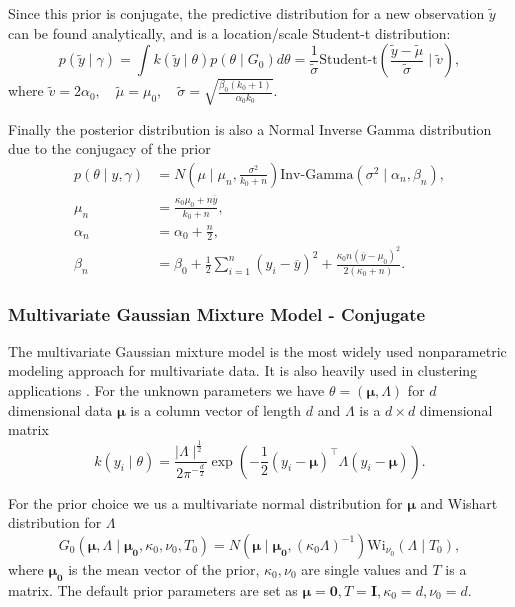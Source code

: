 \documentclass[nojss]{jss}
\begin{document}
Since this prior is conjugate, the predictive distribution for a new observation $\tilde{y}$ can be found analytically, and is a location/scale Student-t distribution:
\begin{equation*}
p(\tilde{y} \mid \gamma) = \int k(\tilde{y}\mid\theta) p(\theta \mid G_0) d\theta = \frac{1}{\tilde{\sigma}} \text{Student-t} \left( \frac{ \tilde{y} - \tilde{\mu}}{\tilde{\sigma}} \mid \tilde{v}\right),
\end{equation*}
where $\tilde{v} = 2 \alpha_0, \quad \tilde{\mu} = \mu_0, \quad \tilde{\sigma} = \sqrt{ \frac{\beta_0 (k_0 + 1)}{\alpha_0 k_0}}$.

Finally the posterior distribution is also a Normal Inverse Gamma distribution due to the conjugacy of the prior
\begin{align*}
p(\theta \mid y, \gamma) & = N ( \mu \mid \mu _n , \frac{\sigma ^2}{k_0 + n}  ) \text{Inv-Gamma} ( \sigma ^2 \mid \alpha _n , \beta _n), \\
\mu _n & = \frac{\kappa _0 \mu _0 + n \overline{y}}{k_0 + n}, \\
\alpha _n & = \alpha _0 + \frac{n}{2}, \\
\beta _n & = \beta _0 + \frac{1}{2} \sum _{i=1} ^n (y_i - \overline{y} ) ^2 + \frac{\kappa _0 n (\overline{y} - \mu _0)^2}{2(\kappa _0 + n)} .
\end{align*}

\subsubsection{Multivariate Gaussian Mixture Model - Conjugate}

The multivariate Gaussian mixture model is the most widely used nonparametric modeling approach for multivariate data. It is also heavily used in clustering applications \citep{maceachern_estimating_1998}. For the unknown parameters we have $\theta = ( \boldsymbol{\mu}, \Lambda )$ for $d$ dimensional data $\boldsymbol{\mu}$ is a column vector of length $d$ and $\Lambda$ is a $d \times d$ dimensional matrix
\begin{equation*}
k(y_i \mid \theta) = \frac{\mid \Lambda \mid ^{\frac{1}{2}}}{2 \pi ^{- \frac{d}{2}}} \exp \left( - \frac{1}{2} (y_i - \boldsymbol{\mu})^\top \Lambda (y_i - \boldsymbol{\mu})  \right).
\end{equation*}

For the prior choice we us a multivariate normal distribution for $\boldsymbol{\mu}$ and Wishart distribution for $\Lambda$
\begin{equation*}
G_0 (\boldsymbol{\mu} , \Lambda \mid  \boldsymbol{\mu _0} , \kappa _0, \nu _0, T_0)  = N ( \boldsymbol{\mu} \mid \boldsymbol{\mu _0} , (\kappa _0 \Lambda )^{-1} ) \text{Wi} _{\nu _0} (\Lambda \mid T_0),
\end{equation*}
where $\boldsymbol{\mu _0}$ is the mean vector of the prior, $\kappa _0, \nu _0$ are single values and $T$ is a matrix. The default prior parameters are set as $\boldsymbol{\mu} = \mathbf{0}, T = \mathbf{I}, \kappa_0 = d, \nu_0 = d$.
\end{document}
